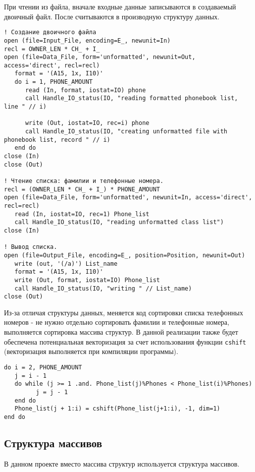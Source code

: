 \documentclass[a4paper,14pt]{article}
\begin{document}
При чтении из файла, вначале входные данные записываются в создаваемый двоичный файл. После считываются в производную структуру данных.
\begin{lstlisting}[caption={Ввод и вывод данных. Создание двоичного файла.}]
! Создание двоичного файла
open (file=Input_File, encoding=E_, newunit=In)
recl = OWNER_LEN * CH_ + I_
open (file=Data_File, form='unformatted', newunit=Out, access='direct', recl=recl)
   format = '(A15, 1x, I10)'
   do i = 1, PHONE_AMOUNT
      read (In, format, iostat=IO) phone
      call Handle_IO_status(IO, "reading formatted phonebook list, line " // i)
      
      write (Out, iostat=IO, rec=i) phone
      call Handle_IO_status(IO, "creating unformatted file with phonebook list, record " // i)
   end do
close (In)
close (Out)

! Чтение списка: фамилии и телефонные номера.
recl = (OWNER_LEN * CH_ + I_) * PHONE_AMOUNT
open (file=Data_File, form='unformatted', newunit=In, access='direct', recl=recl)
   read (In, iostat=IO, rec=1) Phone_list
   call Handle_IO_status(IO, "reading unformatted class list")
close (In)

! Вывод списка.
open (file=Output_File, encoding=E_, position=Position, newunit=Out)
   write (out, '(/a)') List_name
   format = '(A15, 1x, I10)'
   write (Out, format, iostat=IO) Phone_list
   call Handle_IO_status(IO, "writing " // List_name)
close (Out)
\end{lstlisting}

Из-за отличая структуры данных, меняется код сортировки списка телефонных номеров - не нужно отдельно сортировать фамилии и телефонные номера, выполняется сортировка массива структур. В данной реализации также будет обеспечена потенциальная векторизация за счет использования функции \texttt{cshift} (векторизация выполняется при компиляции программы).

\begin{lstlisting}[caption={Сортировка массива структур}]
do i = 2, PHONE_AMOUNT
   j = i - 1
   do while (j >= 1 .and. Phone_list(j)%Phones < Phone_list(i)%Phones)
         j = j - 1
   end do
   Phone_list(j + 1:i) = cshift(Phone_list(j+1:i), -1, dim=1)
end do
\end{lstlisting}

\subsection{Структура массивов}

В данном проекте вместо массива структур используется структура массивов.
\end{document}
